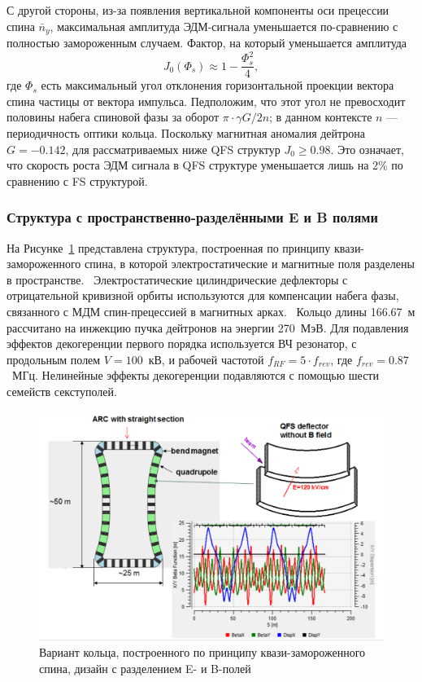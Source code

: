 С другой стороны, из-за появления вертикальной компоненты оси прецессии спина $\bar n_y$, максимальная амплитуда ЭДМ-сигнала уменьшается по-сравнению с полностью замороженным случаем. Фактор, на который уменьшается амплитуда~\cite{Senichev:QFS_IPAC15}
\[
J_0(\Phi_s) \approx 1 - \frac{\Phi_s^2}{4},
\]
где $\Phi_s$ есть максимальный угол отклонения горизонтальной проекции вектора спина частицы от вектора импульса. Педположим, что этот угол не превосходит половины набега спиновой фазы за оборот ${\pi\cdot \gamma G/2n}$; в данном контексте $n$ --- периодичность оптики кольца. Поскольку магнитная аномалия дейтрона 
${G = -0.142}$, для рассматриваемых ниже QFS структур ${J_0\ge 0.98}$.
Это означает, что скорость роста ЭДМ сигнала в QFS структуре уменьшается лишь на 2\% по сравнению с  FS структурой. 

\subsubsection{Структура с пространственно-разделёнными E и B полями}\label{chpt2:lattice:QFS:6_3}

На Рисунке~\ref{fig:QFS_6_3_lattice} представлена структура, построенная по принципу 
квази-замороженного спина, в которой электростатические и магнитные поля 
разделены в пространстве.~\cite{Senichev:Lattices} Электростатические цилиндрические дефлекторы 
с отрицательной кривизной орбиты используются для компенсации набега фазы, 
связанного с МДМ спин-прецессией в магнитных арках.~\cite{Senichev:QFS_IPAC15} 
Кольцо длины 166.67~м рассчитано на инжекцию пучка дейтронов на энергии 270~МэВ. 
Для подавления эффектов декогеренции первого порядка используется ВЧ резонатор, 
с продольным полем ${V = 100}$~кВ, и рабочей частотой ${f_{RF} = 5\cdot f_{rev}}$, 
где ${f_{rev} = 0.87}$~МГц. Нелинейные эффекты декогеренции подавляются с помощью шести семейств секступолей.

\begin{figure}[H]
	\centering
	\includegraphics[width=\linewidth]{images/chapter2/6_3_lattice}
	\caption{Вариант кольца, построенного по принципу квази-замороженного спина, 
		дизайн с разделением E- и B-полей
	\label{fig:QFS_6_3_lattice}}
\end{figure}

